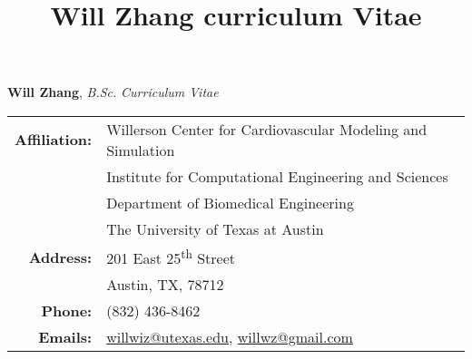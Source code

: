 \documentclass[11pt]{article}
\title{Will Zhang curriculum Vitae}
\begin{document}
\vspace*{-0.35in}

\thispagestyle{empty}

\noindent
\begin{center}
\LARGE{\textbf{Will Zhang}}, \large \textit{B.Sc.} \LARGE \textbar \Large\textit{Curriculum Vitae}
\end{center}

\large
\vspace{-2ex}
\noindent \makebox[\linewidth]{\rule{\textwidth}{1.0pt}} 
\normalsize

\vspace{1ex}

\noindent
\begin{tabularx}{\textwidth}{p{} @{}X}
\multicolumn{1}{r}{\bf Affiliation:}
	& Willerson Center for Cardiovascular Modeling and Simulation	\\
    & Institute for Computational Engineering and Sciences	\\
	& Department of Biomedical Engineering 	\\
	& The University of Texas at Austin 	\\
\multicolumn{1}{r}{\bf Address:}
	& 201 East 25\textsuperscript{th} Street 	\\ 
    & Austin, TX, 78712	\\
\multicolumn{1}{r}{\bf Phone:}
	& (832) 436-8462	\\
\multicolumn{1}{r}{\bf Emails:}
	& \href{mailto:willwiz@utexas.edu}{willwiz@utexas.edu}, 
    \href{mailto:willwz@gmail.edu}{willwz@gmail.com}	\\
\end{tabularx}

\end{document}
